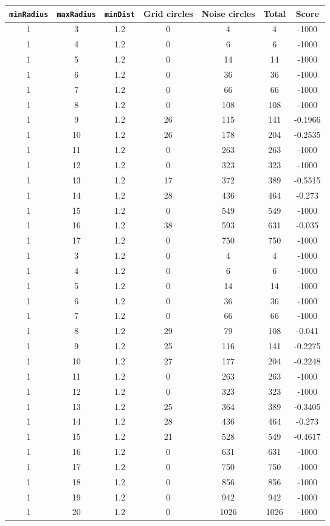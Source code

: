 \documentclass[letterpaper, 12pt]{article}
\begin{document}
\begin{longtable}{|c|c|c|c|c|c|c|}
\hline
\textbf{\texttt{minRadius}} & \textbf{\texttt{maxRadius}} & \textbf{\texttt{minDist}} & \textbf{Grid circles} & \textbf{Noise circles} & \textbf{Total} & \textbf{Score} \\
\hline
1 & 3 & 1.2 & 0 & 4 & 4 & -1000 \\
\hline
1 & 4 & 1.2 & 0 & 6 & 6 & -1000 \\
\hline
1 & 5 & 1.2 & 0 & 14 & 14 & -1000 \\
\hline
1 & 6 & 1.2 & 0 & 36 & 36 & -1000 \\
\hline
1 & 7 & 1.2 & 0 & 66 & 66 & -1000 \\
\hline
1 & 8 & 1.2 & 0 & 108 & 108 & -1000 \\
\hline
1 & 9 & 1.2 & 26 & 115 & 141 & -0.1966 \\
\hline
1 & 10 & 1.2 & 26 & 178 & 204 & -0.2535 \\
\hline
1 & 11 & 1.2 & 0 & 263 & 263 & -1000 \\
\hline
1 & 12 & 1.2 & 0 & 323 & 323 & -1000 \\
\hline
1 & 13 & 1.2 & 17 & 372 & 389 & -0.5515 \\
\hline
1 & 14 & 1.2 & 28 & 436 & 464 & -0.273 \\
\hline
1 & 15 & 1.2 & 0 & 549 & 549 & -1000 \\
\hline
1 & 16 & 1.2 & 38 & 593 & 631 & -0.035 \\
\hline
1 & 17 & 1.2 & 0 & 750 & 750 & -1000 \\
\hline
1 & 3 & 1.2 & 0 & 4 & 4 & -1000 \\
\hline
1 & 4 & 1.2 & 0 & 6 & 6 & -1000 \\
\hline
1 & 5 & 1.2 & 0 & 14 & 14 & -1000 \\
\hline
1 & 6 & 1.2 & 0 & 36 & 36 & -1000 \\
\hline
1 & 7 & 1.2 & 0 & 66 & 66 & -1000 \\
\hline
1 & 8 & 1.2 & 29 & 79 & 108 & -0.041 \\
\hline
1 & 9 & 1.2 & 25 & 116 & 141 & -0.2275 \\
\hline
1 & 10 & 1.2 & 27 & 177 & 204 & -0.2248 \\
\hline
1 & 11 & 1.2 & 0 & 263 & 263 & -1000 \\
\hline
1 & 12 & 1.2 & 0 & 323 & 323 & -1000 \\
\hline
1 & 13 & 1.2 & 25 & 364 & 389 & -0.3405 \\
\hline
1 & 14 & 1.2 & 28 & 436 & 464 & -0.273 \\
\hline
1 & 15 & 1.2 & 21 & 528 & 549 & -0.4617 \\
\hline
1 & 16 & 1.2 & 0 & 631 & 631 & -1000 \\
\hline
1 & 17 & 1.2 & 0 & 750 & 750 & -1000 \\
\hline
1 & 18 & 1.2 & 0 & 856 & 856 & -1000 \\
\hline
1 & 19 & 1.2 & 0 & 942 & 942 & -1000 \\
\hline
1 & 20 & 1.2 & 0 & 1026 & 1026 & -1000 \\
\hline
\end{longtable}
\end{document}
